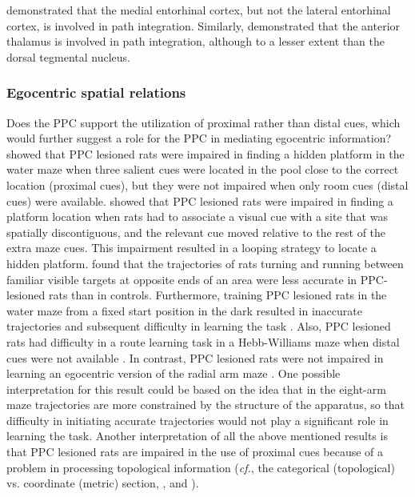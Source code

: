 \documentclass[doc, longtable]{apa6}
\begin{document}
\textcite{VanCauter2013} demonstrated that the medial entorhinal cortex, but not the lateral entorhinal cortex, is involved in path integration. Similarly, \textcite{Frohardt2006a} demonstrated that the anterior thalamus is involved in path integration, although to a lesser extent than the dorsal tegmental nucleus.

\subsubsection{Egocentric spatial relations}
Does the PPC support the utilization of proximal rather than distal cues, which would further suggest a role for the PPC in mediating egocentric information? \textcite{Save2000a, Save2000c} showed that PPC lesioned rats were impaired in finding a hidden platform in the water maze when three salient cues were located in the pool close to the correct location (proximal cues), but they were not impaired when only room cues (distal cues) were available. \textcite{Kolb1987a} showed that PPC lesioned rats were impaired in finding a platform location when rats had to associate a visual cue with a site that was spatially discontiguous, and the relevant cue moved relative to the rest of the extra maze cues. This impairment resulted in a looping strategy to locate a hidden platform. \textcite{Foreman1992a} found that the trajectories of rats turning and running between familiar visible targets at opposite ends of an area were less accurate in PPC-lesioned rats than in controls. Furthermore, training PPC lesioned rats in the water maze from a fixed start position in the dark resulted in inaccurate trajectories and subsequent difficulty in learning the task \parencite{Save1996a} . Also, PPC lesioned rats had difficulty in a route learning task in a Hebb-Williams maze when distal cues were not available \parencite{Rogers2007a}. In contrast, PPC lesioned rats were not impaired in learning an egocentric version of the radial arm maze \parencite{Kesner1989b, King1992a}. One possible interpretation for this result could be based on the idea that in the eight-arm maze trajectories are more constrained by the structure of the apparatus, so that difficulty in initiating accurate trajectories would not play a significant role in learning the task. Another interpretation of all the above mentioned results is that PPC lesioned rats are impaired in the use of proximal cues because of a problem in processing topological information (\textit{cf.}, the categorical (topological) vs. coordinate (metric) section, \cite{Gallistel1990a}, and \cite{Poucet1993a}). 
	
\end{document}
